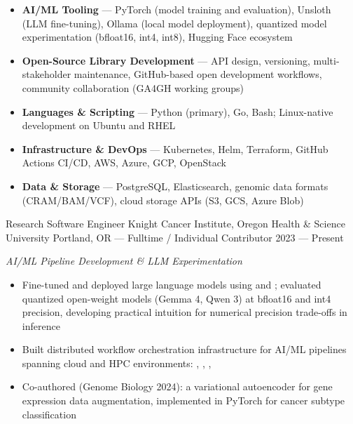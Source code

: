 




\begin{itemize}
    \item \textbf{AI/ML Tooling} --- PyTorch (model training and evaluation), Unsloth (LLM fine-tuning), Ollama (local model deployment), quantized model experimentation (bfloat16, int4, int8), Hugging Face ecosystem
    \item \textbf{Open-Source Library Development} --- API design, versioning, multi-stakeholder maintenance, GitHub-based open development workflows, community collaboration (GA4GH working groups)
    \item \textbf{Languages \& Scripting} --- Python (primary), Go, Bash; Linux-native development on Ubuntu and RHEL
    \item \textbf{Infrastructure \& DevOps} --- Kubernetes, Helm, Terraform, GitHub Actions CI/CD, AWS, Azure, GCP, OpenStack
    \item \textbf{Data \& Storage} --- PostgreSQL, Elasticsearch, genomic data formats (CRAM/BAM/VCF), cloud storage APIs (S3, GCS, Azure Blob)
\end{itemize}


\showoff
{Research Software Engineer}
{Knight Cancer Institute, Oregon Health \& Science University}
{Portland, OR --- Fulltime / Individual Contributor}
{2023 --- Present}

\vspace{1em}

\emph{AI/ML Pipeline Development \& LLM Experimentation}

\begin{itemize}
    \item Fine-tuned and deployed large language models using  and ; evaluated quantized open-weight models (Gemma 4, Qwen 3) at bfloat16 and int4 precision, developing practical intuition for numerical precision trade-offs in inference
    \item Built distributed workflow orchestration infrastructure for AI/ML pipelines spanning cloud and HPC environments: , , , 
    \item Co-authored  (Genome Biology 2024): a variational autoencoder for gene expression data augmentation, implemented in PyTorch for cancer subtype classification
\end{itemize}

